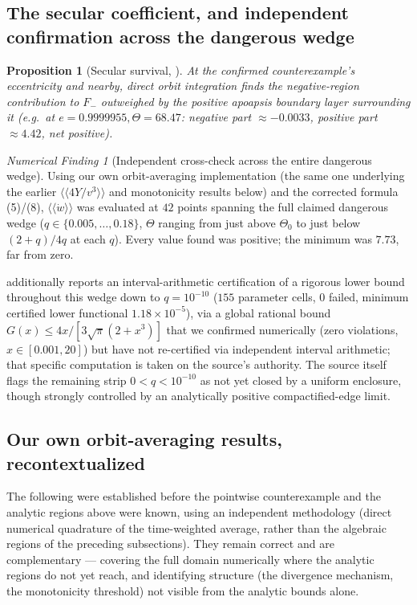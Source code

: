\documentclass[12pt]{amsart}
\theoremstyle{plain}
\newtheorem{proposition}[theorem]{Proposition}
\theoremstyle{remark}
\newtheorem*{finding}{Numerical Finding}
\begin{document}
\subsection{The secular coefficient, and independent confirmation across the dangerous wedge}

\begin{proposition}[Secular survival, \cite{EbertAuditedSecular2026}]\label{prop:secularsurvives}
At the confirmed counterexample's eccentricity and nearby, direct orbit integration finds the negative-region contribution to $F_-$ outweighed by the positive apoapsis boundary layer surrounding it (e.g.\ at $e=0.9999955,\Theta=68.47$: negative part $\approx-0.0033$, positive part $\approx4.42$, net positive).
\end{proposition}

\begin{finding}[Independent cross-check across the entire dangerous wedge]\label{find:secularverified}
Using our own orbit-averaging implementation (the same one underlying the earlier $\langle\langle4Y/v^3\rangle\rangle$ and monotonicity results below) and the corrected formula (5)/(8), $\langle\langle\dot w\rangle\rangle$ was evaluated at $42$ points spanning the full claimed dangerous wedge ($q\in\{0.005,\ldots,0.18\}$, $\Theta$ ranging from just above $\Theta_0$ to just below $(2+q)/4q$ at each $q$). Every value found was positive; the minimum was $7.73$, far from zero.
\end{finding}

\cite{EbertAuditedSecular2026} additionally reports an interval-arithmetic certification of a rigorous lower bound throughout this wedge down to $q=10^{-10}$ ($155$ parameter cells, $0$ failed, minimum certified lower functional $1.18\times10^{-5}$), via a global rational bound $G(x)\leq4x/[3\sqrt\pi(2+x^3)]$ that we confirmed numerically (zero violations, $x\in[0.001,20]$) but have not re-certified via independent interval arithmetic; that specific computation is taken on the source's authority. The source itself flags the remaining strip $0<q<10^{-10}$ as not yet closed by a uniform enclosure, though strongly controlled by an analytically positive compactified-edge limit.

\subsection{Our own orbit-averaging results, recontextualized}

The following were established before the pointwise counterexample and the analytic regions above were known, using an independent methodology (direct numerical quadrature of the time-weighted average, rather than the algebraic regions of the preceding subsections). They remain correct and are complementary --- covering the full domain numerically where the analytic regions do not yet reach, and identifying structure (the divergence mechanism, the monotonicity threshold) not visible from the analytic bounds alone.
\end{document}
